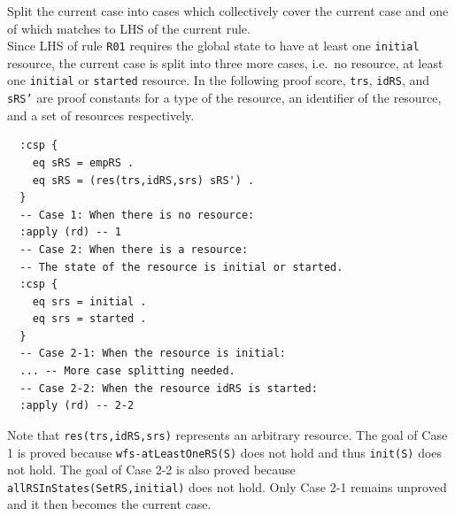 \documentclass[12pt]{report}
\newcommand{\stt}[1]{{\small{\tt {#1}}}}
\begin{document}
 Split the current case into cases which
collectively cover the current case and one of which matches to LHS of
the current rule. \\ Since LHS of rule {\tt R01} requires the global
state to have at least one {\tt initial} resource, the current case is split
into three more cases, i.e.\ no resource, at least one {\tt initial}
or {\tt started} resource. In the following proof score, {\tt trs},
{\tt idRS}, and {\tt sRS'} are proof constants for a type of the
resource, an identifier of the resource, and a set of resources
respectively.
\small
\begin{verbatim}
  :csp { 
    eq sRS = empRS .
    eq sRS = (res(trs,idRS,srs) sRS') .
  }
  -- Case 1: When there is no resource:
  :apply (rd) -- 1
  -- Case 2: When there is a resource:
  -- The state of the resource is initial or started.
  :csp { 
    eq srs = initial .
    eq srs = started .
  }
  -- Case 2-1: When the resource is initial:
  ... -- More case splitting needed.
  -- Case 2-2: When the resource idRS is started:
  :apply (rd) -- 2-2
\end{verbatim}
\normalsize
Note that \stt{res(trs,idRS,srs)} represents an arbitrary resource.
The goal of Case 1 is proved because \stt{wfs-atLeastOneRS(S)} does
not hold and thus \stt{init(S)} does not hold. The goal of Case 2-2 is
also proved because \stt{allRSInStates(SetRS,initial)} does not hold.
Only Case 2-1 remains unproved and it then becomes the current case.\\
\end{document}
